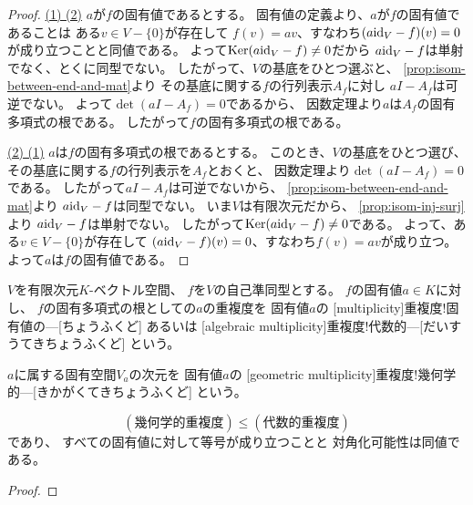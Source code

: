 \documentclass[report]{jlreq}
\begin{document}
\begin{proof}
    \uline{(1) \Rightarrow (2)} \quad
    $a$が$f$の固有値であるとする。
    固有値の定義より、$a$が$f$の固有値であることは
    ある$v \in V - \{ 0 \}$が存在して
    $f(v) = av$、すなわち$(a \mathrm{id}_V - f)(v) = 0$が成り立つことと同値である。
    よって$\operatorname{\mathrm{Ker}} (a \mathrm{id}_V - f) \neq 0$だから
    $a \mathrm{id}_V - f$は単射でなく、とくに同型でない。
    したがって、$V$の基底をひとつ選ぶと、
    \cref{prop:isom-between-end-and-mat}より
    その基底に関する$f$の行列表示$A_f$に対し
    $aI - A_f$は可逆でない。
    よって$\det (aI - A_f) = 0$であるから、
    因数定理より$a$は$A_f$の固有多項式の根である。
    したがって$f$の固有多項式の根である。

    \uline{(2) \Rightarrow (1)} \quad
    $a$は$f$の固有多項式の根であるとする。
    このとき、$V$の基底をひとつ選び、
    その基底に関する$f$の行列表示を$A_f$とおくと、
    因数定理より$\det (aI - A_f) = 0$である。
    したがって$aI - A_f$は可逆でないから、
    \cref{prop:isom-between-end-and-mat}より
    $a \mathrm{id}_V - f$は同型でない。
    いま$V$は有限次元だから、
    \cref{prop:isom-inj-surj}より
    $a \mathrm{id}_V - f$は単射でない。
    したがって$\operatorname{\mathrm{Ker}} (a \mathrm{id}_V - f) \neq 0$である。
    よって、ある$v \in V - \{ 0 \}$が存在して
    $(a \mathrm{id}_V - f)(v) = 0$、すなわち$f(v) = av$が成り立つ。
    よって$a$は$f$の固有値である。
\end{proof}

\begin{definition}[固有値の重複度]
    $V$を有限次元$K$-ベクトル空間、
    $f$を$V$の自己準同型とする。
    $f$の固有値$a \in K$に対し、
    $f$の固有多項式の根としての$a$の重複度を
    固有値$a$の
    [multiplicity]{重複度!固有値の---}[ちょうふくど]
    あるいは
    [algebraic multiplicity]{重複度!代数的---}[だいすうてきちょうふくど]
    という。

    $a$に属する固有空間$V_a$の次元を
    固有値$a$の
    [geometric multiplicity]{重複度!幾何学的---}[きかがくてきちょうふくど]
    という。
\end{definition}

\begin{proposition}
    \begin{equation}
        (\text{幾何学的重複度}) \le (\text{代数的重複度})
    \end{equation}
    であり、
    すべての固有値に対して等号が成り立つことと
    対角化可能性は同値である。
\end{proposition}

\begin{proof}
    \TODO{}
\end{proof}
\end{document}
